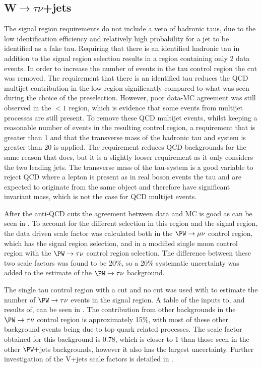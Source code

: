 \subsection{W$\rightarrow \tau\nu$+jets}
\label{sec:parkedwtaunu}
The signal region requirements do not include a veto of hadronic taus, due to the low identification efficiency and relatively high probability for a jet to be identified as a fake tau. Requiring that there is an identified hadronic tau in addition to the signal region selection results in a region containing only 2 data events. In order to increase the number of events in the tau control region the \jetmetdphi cut was removed. The requirement that there is an identified tau reduces the \ac{QCD} multijet contribution in the low \jetmetdphi region significantly compared to what was seen during the choice of the preselection. However, poor data-\ac{MC} agreement was still observed in the \jetmetdphi$<1$ region, which is evidence that some events from multijet processes are still present. To remove these \ac{QCD} multijet events, whilst keeping a reasonable number of events in the resulting control region, a requirement that \jetmetdphileading is greater than 1 and that the transverse mass of the hadronic tau and \MET system is greater than 20 \GeV is applied. The \jetmetdphileading requirement reduces \ac{QCD} backgrounds for the same reason that \jetmetdphi does, but it is a slightly looser requirement as it only considers the two leading jets. The transverse mass of the tau-\MET system is a good variable to reject \ac{QCD} where a lepton is present as in real \PW boson events the tau and \MET are expected to originate from the same object and therefore have significant invariant mass, which is not the case for \ac{QCD} multijet events.

After the anti-\ac{QCD} cuts the agreement between data and \ac{MC} is good as can be seen in . To account for the different \jetmetdphi selection in this region and the signal region, the data driven scale factor was calculated both in the $\PW\rightarrow\mu\nu$ control region, which has the signal region \jetmetdphi selection, and in a modified single muon control region with the $\PW\rightarrow\tau\nu$ control region \jetmetdphi selection. The difference between these two scale factors was found to be 20\%, so a 20\% systematic uncertainty was added to the estimate of the $\PW\rightarrow\tau\nu$ background.

The single tau control region with a \jetmetdphileading cut and no \jetmetdphi cut was used with  to estimate the number of $\PW\rightarrow\tau\nu$ events in the signal region. A table of the inputs to, and results of,  can be seen in . The contribution from other backgrounds in the $\PW\rightarrow\tau\nu$ control region is approximately 15\%, with most of these other background events being due to top quark related processes. The scale factor obtained for this background is 0.78, which is closer to 1 than those seen in the other $\PW+$jets backgrounds, however it also has the largest uncertainty. Further investigation of the V+jets scale factors is detailed in .

